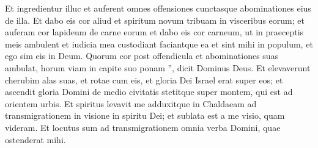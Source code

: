 \begin{biblechapter}
\begin{biblechapter}
\begin{biblechapter}
\begin{biblechapter}
\begin{biblechapter}
\begin{biblechapter}
\begin{biblechapter}
\begin{biblechapter}
\begin{biblechapter}
\begin{biblechapter}
\begin{biblechapter}
\verse Et ingredientur illuc et auferent omnes offensiones cunctasque abominationes eius de illa. 
\verse Et dabo eis cor aliud et spiritum novum tribuam in visceribus eorum; et auferam cor lapideum de carne eorum et dabo eis cor carneum, 
\verse ut in praeceptis meis ambulent et iudicia mea custodiant faciantque ea et sint mihi in populum, et ego sim eis in Deum. 
 \verse Quorum cor post offendicula et abominationes suas ambulat, horum viam in capite suo ponam ”, dicit Dominus Deus.
 \verse Et elevaverunt cherubim alas suas, et rotae cum eis, et gloria Dei Israel erat super eos; 
\verse et ascendit gloria Domini de medio civitatis stetitque super montem, qui est ad orientem urbis.
 \verse Et spiritus levavit me adduxitque in Chaldaeam ad transmigrationem in visione in spiritu Dei; et sublata est a me visio, quam videram. 
\verse Et locutus sum ad transmigrationem omnia verba Domini, quae ostenderat mihi.
 

\end{biblechapter}
\end{biblechapter}
\end{biblechapter}
\end{biblechapter}
\end{biblechapter}
\end{biblechapter}
\end{biblechapter}
\end{biblechapter}
\end{biblechapter}
\end{biblechapter}
\end{biblechapter}
